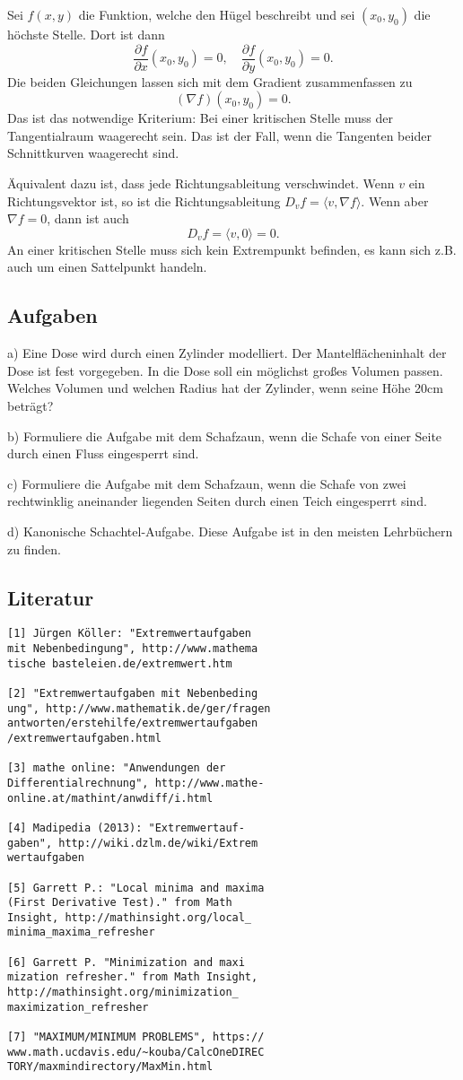 \documentclass[a4paper,11pt,fleqn,twocolumn]{article}
\begin{document}
Sei \(f(x,y)\) die Funktion, welche den Hügel beschreibt und sei
\((x_0,y_0)\) die höchste Stelle. Dort ist dann
\[\frac{\partial f}{\partial x}(x_0,y_0)=0,\quad
\frac{\partial f}{\partial y}(x_0,y_0)=0.\]
Die beiden Gleichungen lassen sich mit dem Gradient zusammenfassen
zu
\[(\nabla f)(x_0,y_0)=0.\]
Das ist das notwendige Kriterium: Bei einer kritischen Stelle
muss der Tangentialraum waagerecht sein. Das ist der Fall, wenn
die Tangenten beider Schnittkurven waagerecht sind.

Äquivalent dazu ist, dass jede Richtungsableitung verschwindet.
Wenn \(v\) ein Richtungsvektor ist, so ist die Richtungsableitung
\(D_vf = \langle v,\nabla f\rangle\). Wenn aber \(\nabla f=0\),
dann ist auch
\[D_v f = \langle v,0\rangle = 0.\]
An einer kritischen Stelle muss sich kein Extrempunkt befinden,
es kann sich z.B. auch um einen Sattelpunkt handeln.

\subsection*{Aufgaben}

a) Eine Dose wird durch einen Zylinder modelliert.
Der Mantelflächeninhalt der Dose ist fest vorgegeben.
In die Dose soll ein möglichst großes Volumen passen.
Welches Volumen und welchen Radius hat der Zylinder, wenn seine
Höhe 20cm beträgt?

b) Formuliere die Aufgabe mit dem Schafzaun, wenn die Schafe von
einer Seite durch einen Fluss eingesperrt sind.

c) Formuliere die Aufgabe mit dem Schafzaun, wenn die Schafe
von zwei rechtwinklig aneinander liegenden Seiten durch einen
Teich eingesperrt sind.

d) Kanonische Schachtel-Aufgabe. Diese Aufgabe ist in den meisten
Lehrbüchern zu finden.

\subsection*{Literatur}

\begin{verbatim}
[1] Jürgen Köller: "Extremwertaufgaben
mit Nebenbedingung", http://www.mathema
tische basteleien.de/extremwert.htm

[2] "Extremwertaufgaben mit Nebenbeding
ung", http://www.mathematik.de/ger/fragen
antworten/erstehilfe/extremwertaufgaben
/extremwertaufgaben.html

[3] mathe online: "Anwendungen der
Differentialrechnung", http://www.mathe-
online.at/mathint/anwdiff/i.html

[4] Madipedia (2013): "Extremwertauf-
gaben", http://wiki.dzlm.de/wiki/Extrem
wertaufgaben

[5] Garrett P.: "Local minima and maxima
(First Derivative Test)." from Math
Insight, http://mathinsight.org/local_
minima_maxima_refresher

[6] Garrett P. "Minimization and maxi
mization refresher." from Math Insight,
http://mathinsight.org/minimization_
maximization_refresher

[7] "MAXIMUM/MINIMUM PROBLEMS", https://
www.math.ucdavis.edu/~kouba/CalcOneDIREC
TORY/maxmindirectory/MaxMin.html
\end{verbatim}
\end{document}
